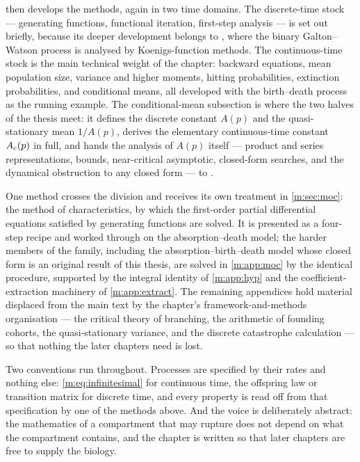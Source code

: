  then develops the methods, again in two time domains. The
discrete-time stock --- generating functions, functional iteration, first-step
analysis --- is set out briefly, because its deeper development belongs to \ChA,
where the binary Galton--Watson process is analysed by Koenigs-function methods.
The continuous-time stock is the main technical weight of the chapter: backward
equations, mean population size, variance and higher moments, hitting
probabilities, extinction probabilities, and conditional means, all developed
with the birth--death process as the running example. The conditional-mean
subsection is where the two halves of the thesis meet: it defines the discrete
constant $A(p)$ and the quasi-stationary mean $1/A(p)$, derives the elementary
continuous-time constant $A_{\mathrm{c}}(p)$ in full, and hands the analysis of $A(p)$
itself --- product and series representations, bounds, near-critical asymptotic,
closed-form searches, and the dynamical obstruction to any closed form --- to
\ChA.

One method crosses the division and receives its own treatment in
\cref{m:sec:moc}: the method of characteristics, by which the first-order
partial differential equations satisfied by generating functions are solved. It
is presented as a four-step recipe and worked through on the absorption--death
model; the harder members of the family, including the absorption--birth--death
model whose closed form is an original result of this thesis, are solved in
\cref{m:app:moc} by the identical procedure, supported by the integral identity
of \cref{m:app:hyp} and the coefficient-extraction machinery of
\cref{m:app:extract}. The remaining appendices hold material displaced from the
main text by the chapter's framework-and-methods organisation --- the critical
theory of branching, the arithmetic of founding cohorts, the quasi-stationary
variance, and the discrete catastrophe calculation --- so that nothing the later
chapters need is lost.

Two conventions run throughout. Processes are specified by their rates and
nothing else: \cref{m:eq:infinitesimal} for continuous time, the offspring law
or transition matrix for discrete time, and every property is read off from
that specification by one of the methods above. And the voice is deliberately
abstract: the mathematics of a compartment that may rupture does not depend on
what the compartment contains, and the chapter is written so that later
chapters are free to supply the biology.
